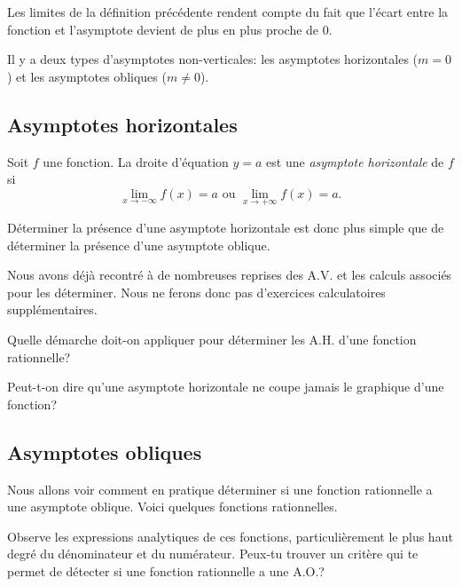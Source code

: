 \documentclass[a4paper,12pt]{report}
\newcommand{\pinf}{+\infty}
\newcommand{\minf}{-\infty}
\begin{document}
Les limites de la définition précédente rendent compte du fait que l'écart entre
la fonction et l'asymptote devient de plus en plus proche de \(0\).

Il y a deux types d'asymptotes non-verticales: les asymptotes horizontales (\(m=0\)) et
les asymptotes obliques (\(m\neq 0\)).
\subsection{Asymptotes horizontales}
\label{sec:org5cabcc1}
\begin{propriete}
Soit \(f\) une fonction. La droite d'équation \(y=a\) est une \emph{asymptote horizontale}
de \(f\) si
\[\lim\limits_{x\to\minf}f(x)=a\text{ ou }\lim\limits_{x\to \pinf}f(x)=a.\]
\end{propriete}

Déterminer la présence d'une asymptote horizontale est donc plus simple que de
déterminer la présence d'une asymptote oblique.

Nous avons déjà recontré à de nombreuses reprises des A.V. et les calculs
associés pour les déterminer. Nous ne ferons donc pas d'exercices calculatoires supplémentaires.
\begin{exercice}
Quelle démarche doit-on appliquer pour déterminer les A.H. d'une fonction rationnelle?
\end{exercice}
\begin{exercice}
Peut-t-on dire qu'une asymptote horizontale ne coupe jamais le graphique d'une fonction?
\end{exercice}
\subsection{Asymptotes obliques}
\label{sec:org02a84cd}
Nous allons voir comment en pratique déterminer si une fonction rationnelle a
une asymptote oblique.
Voici quelques fonctions rationnelles.

\begin{center}

\end{center}

Observe les expressions
analytiques de ces fonctions, particulièrement le plus haut degré du
dénominateur et du numérateur. Peux-tu
trouver un critère qui te permet de détecter si une fonction rationnelle a une A.O.?
\vspace{6cm}
\end{document}
